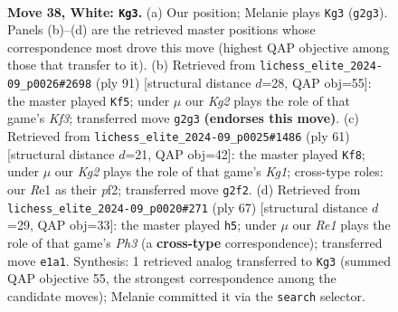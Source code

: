 \documentclass[11pt]{article}
\begin{document}
\clearpage

\begin{figure}[p]\centering
\begin{subfigure}{0.46\textwidth}\centering
\resizebox{\linewidth}{!}{%
\newchessgame
\chessboard[
  setfen={1r5k/1p3p2/p3p3/8/P3P3/5P1P/1R4KP/4R3 w - - 5 38},
  showmover=false,
  pgfstyle=straightmove, color=movearrow, markmove={g2-g3}
]}
\caption{}
\end{subfigure}\hfill
\begin{subfigure}{0.46\textwidth}\centering
\resizebox{\linewidth}{!}{%
\newchessgame
\chessboard[
  setfen={R7/P4p2/5kp1/4p1p1/8/5P1P/r5P1/4K3 b - - 3 46},
  showmover=false,
  pgfstyle=straightmove, color=movearrow, markmove={f6-f5}
]}
\caption{}
\end{subfigure}
\\[4pt]
\begin{subfigure}{0.46\textwidth}\centering
\resizebox{\linewidth}{!}{%
\newchessgame
\chessboard[
  setfen={2r3k1/pp3pp1/4p3/6pP/P1P3P1/8/5P2/2R3K1 b - - 2 31},
  showmover=false,
  pgfstyle=straightmove, color=movearrow, markmove={g8-f8}
]}
\caption{}
\end{subfigure}\hfill
\begin{subfigure}{0.46\textwidth}\centering
\resizebox{\linewidth}{!}{%
\newchessgame
\chessboard[
  setfen={8/1R3pk1/p2r2pp/8/PP6/4K1P1/5P1P/8 b - - 0 34},
  showmover=false,
  pgfstyle=straightmove, color=movearrow, markmove={h6-h5}
]}
\caption{}
\end{subfigure}
\caption{\textbf{Move 38, White: \texttt{Kg3}.} (a) Our position; Melanie plays \texttt{Kg3} (\texttt{g2g3}). Panels (b)--(d) are the retrieved master positions whose correspondence most drove this move (highest QAP objective among those that transfer to it). (b) Retrieved from \texttt{lichess\_elite\_2024-09\_p0026\#2698} (ply 91) [structural distance $d$=28, QAP obj=55]: the master played \texttt{Kf5}; under $\mu$ our \emph{Kg2} plays the role of that game's \emph{Kf3}; transferred move \texttt{g2g3} \textbf{(endorses this move)}. (c) Retrieved from \texttt{lichess\_elite\_2024-09\_p0025\#1486} (ply 61) [structural distance $d$=21, QAP obj=42]: the master played \texttt{Kf8}; under $\mu$ our \emph{Kg2} plays the role of that game's \emph{Kg1}; cross-type roles: our \emph{R}e1 as their \emph{p}f2; transferred move \texttt{g2f2}. (d) Retrieved from \texttt{lichess\_elite\_2024-09\_p0020\#271} (ply 67) [structural distance $d$=29, QAP obj=33]: the master played \texttt{h5}; under $\mu$ our \emph{Re1} plays the role of that game's \emph{Ph3} (a \textbf{cross-type} correspondence); transferred move \texttt{e1a1}. Synthesis: 1 retrieved analog transferred to \texttt{Kg3} (summed QAP objective 55, the strongest correspondence among the candidate moves); Melanie committed it via the \texttt{search} selector.}
\label{fig:thought-m74}
\end{figure}
\end{document}

